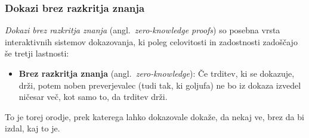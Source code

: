 \documentclass[isrm2, tisk]{fmfdelo}
\begin{document}
\subsubsection{Dokazi brez razkritja znanja}
\textit{Dokazi brez razkritja znanja} (angl.\ \textit{zero-knowledge proofs}) so posebna vrsta interaktivnih
sistemov dokazovanja, ki poleg celovitosti in zadostnosti zadoščajo še tretji lastnosti:
\begin{itemize}
    \item \textbf{Brez razkritja znanja} (angl.\ \textit{zero-knowledge}): Če trditev, ki se dokazuje, 
        drži, potem noben preverjevalec (tudi tak, ki goljufa) ne bo iz dokaza izvedel ničesar več, 
        kot samo to, da trditev drži.
\end{itemize}
To je torej orodje, prek katerega lahko dokazovale dokaže, da nekaj ve, brez da bi izdal, kaj to je.
\end{document}
